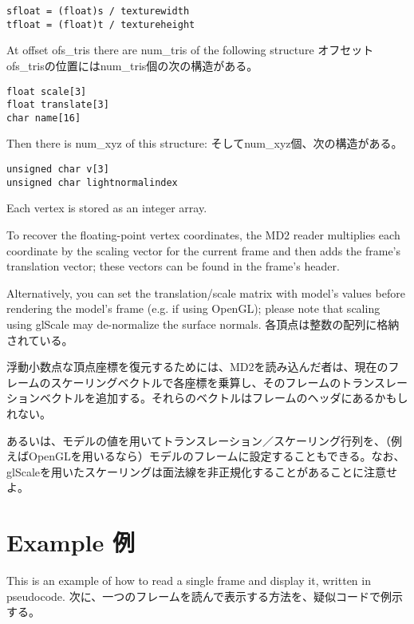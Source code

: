 \documentclass[uplatex,dvipdfmx]{jsarticle} \usepackage{amsmath,amssymb,bm}
\begin{document}
\begin{verbatim}
sfloat = (float)s / texturewidth
tfloat = (float)t / textureheight
\end{verbatim}

\begin{paracol}{2}
At offset ofs\_tris there are num\_tris of the following structure
\switchcolumn
オフセットofs\_trisの位置にはnum\_tris個の次の構造がある。
\end{paracol}

\begin{verbatim}
float scale[3]
float translate[3]
char name[16]
\end{verbatim}

\begin{paracol}{2}
Then there is num\_xyz of this structure:
\switchcolumn
そしてnum\_xyz個、次の構造がある。
\end{paracol}

\begin{verbatim}
unsigned char v[3]
unsigned char lightnormalindex
\end{verbatim}

\begin{paracol}{2}
Each vertex is stored as an integer array.

To recover the floating-point vertex coordinates, the MD2 reader multiplies each coordinate by the scaling vector for the current frame and then adds the frame's translation vector; these vectors can be found in the frame's header.

Alternatively, you can set the translation/scale matrix with model's values before rendering the model's frame (e.g. if using OpenGL); please note that scaling using glScale may de-normalize the surface normals.
\switchcolumn
各頂点は整数の配列に格納されている。

浮動小数点な頂点座標を復元するためには、MD2を読み込んだ者は、現在のフレームのスケーリングベクトルで各座標を乗算し、そのフレームのトランスレーションベクトルを追加する。それらのベクトルはフレームのヘッダにあるかもしれない。

あるいは、モデルの値を用いてトランスレーション／スケーリング行列を、（例えばOpenGLを用いるなら）モデルのフレームに設定することもできる。なお、glScaleを用いたスケーリングは面法線を非正規化することがあることに注意せよ。
\end{paracol}
\section*{Example 例}
\begin{paracol}{2}
This is an example of how to read a single frame and display it, written in pseudocode.
\switchcolumn
次に、一つのフレームを読んで表示する方法を、疑似コードで例示する。
\end{paracol}
\end{document}
